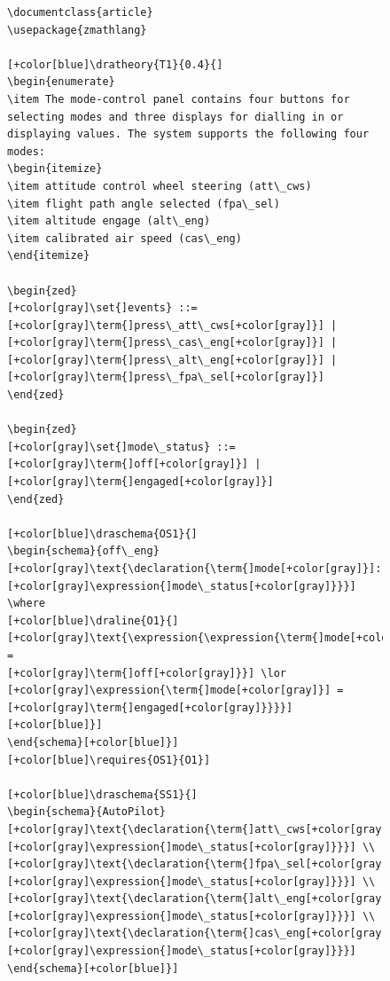  \begin{figure}[H]
 \vspace{-0.2in}
 \centering
 \begin{minipage}{0.45\textwidth}
 \centering
 \begin{tiny}
 \begin{BVerbatim}[commandchars=+\[\]]
\documentclass{article}
\usepackage{zmathlang}

[+color[blue]\dratheory{T1}{0.4}{]
\begin{enumerate}
\item The mode-control panel contains four buttons for 
selecting modes and three displays for dialling in or
displaying values. The system supports the following four modes:
\begin{itemize}
\item attitude control wheel steering (att\_cws)
\item flight path angle selected (fpa\_sel)
\item altitude engage (alt\_eng)
\item calibrated air speed (cas\_eng)
\end{itemize}
 
\begin{zed}
[+color[gray]\set{]events} ::=[+color[gray]\term{]press\_att\_cws[+color[gray]}] |  [+color[gray]\term{]press\_cas\_eng[+color[gray]}] |
[+color[gray]\term{]press\_alt\_eng[+color[gray]}] | [+color[gray]\term{]press\_fpa\_sel[+color[gray]}]
\end{zed}
 
\begin{zed}
[+color[gray]\set{]mode\_status} ::= [+color[gray]\term{]off[+color[gray]}] | [+color[gray]\term{]engaged[+color[gray]}]
\end{zed}
 
[+color[blue]\draschema{OS1}{]
\begin{schema}{off\_eng}
[+color[gray]\text{\declaration{\term{]mode[+color[gray]}]: [+color[gray]\expression{]mode\_status[+color[gray]}}}]
\where
[+color[blue]\draline{O1}{]
[+color[gray]\text{\expression{\expression{\term{]mode[+color[gray]}] =
[+color[gray]\term{]off[+color[gray]}}] \lor
[+color[gray]\expression{\term{]mode[+color[gray]}] = [+color[gray]\term{]engaged[+color[gray]}}}}][+color[blue]}]
\end{schema}[+color[blue]}]
[+color[blue]\requires{OS1}{O1}]
 
[+color[blue]\draschema{SS1}{]
\begin{schema}{AutoPilot}
[+color[gray]\text{\declaration{\term{]att\_cws[+color[gray]}]: [+color[gray]\expression{]mode\_status[+color[gray]}}}] \\
[+color[gray]\text{\declaration{\term{]fpa\_sel[+color[gray]}]: [+color[gray]\expression{]mode\_status[+color[gray]}}}] \\
[+color[gray]\text{\declaration{\term{]alt\_eng[+color[gray]}]: [+color[gray]\expression{]mode\_status[+color[gray]}}}] \\
[+color[gray]\text{\declaration{\term{]cas\_eng[+color[gray]}]: [+color[gray]\expression{]mode\_status[+color[gray]}}}] 
\end{schema}[+color[blue]}]
 

\end{BVerbatim}
\end{tiny}
\end{minipage}
\end{figure}
